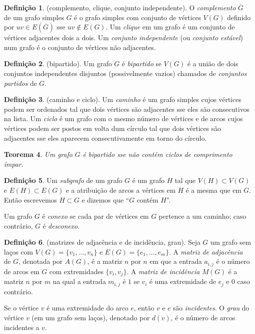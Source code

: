\documentclass{article}
\theoremstyle{plain}
\newtheorem{thm}{Teorema}[section]
\theoremstyle{definition}
\newtheorem{defn}[thm]{Definição}
\theoremstyle{remark}
\begin{document}
\begin{defn} (complemento, clique, conjunto independente).
    O \emph{complemento} \(\overline{G}\) de um grafo simples \(G\) é o grafo simples com conjunto de vértices \(V(G)\) definido por \(uv \in E(\overline{G})\) sse \(uv \notin E(G)\).
    Um \emph{clique} em um grafo é um conjunto de vértices adjacentes dois a dois. Um \emph{conjunto independente} (ou \emph{conjunto estável}) num grafo é o conjunto de vértices não adjacentes.
\end{defn}

\begin{defn} (bipartido).
    Um grafo \(G\) é \emph{bipartido} se \(V(G)\) é a união de dois conjuntos independentes disjuntos (possivelmente vazios) chamados de \emph{conjuntos partidos} de \(G\).
\end{defn}

\begin{defn} (caminho e ciclo).
    Um \emph{caminho} é um grafo simples cujos vértices podem ser ordenados tal que dois vértices são adjacentes sse eles são consecutivos na lista.
    Um \emph{ciclo} é um grafo com o mesmo número de vértices e de arcos cujos vértices podem ser postos em volta dum círculo tal que dois vértices são adjacentes sse eles aparecem consecutivamente em torno do círculo.
\end{defn}

\begin{thm}
    Um grafo \(G\) é bipartido sse não contém ciclos de comprimento ímpar.
\end{thm}

\begin{defn}
    Um \emph{subgrafo} de um grafo \(G\) é um grafo \(H\) tal que \(V(H) \subset V(G)\) e \(E(H) \subset E(G)\) e a atribuição de arcos a vértices em \(H\) é a mesma que em \(G\).
    Então escrevemos \(H \subset G\) e dizemos que ``\(G\) contém \(H\)''.
    
    Um grafo \(G\) é \emph{conexo} se cada par de vértices em \(G\) pertence a um caminho; caso contrário, \(G\) é \emph{desconexo}.
\end{defn}

\begin{defn} (matrizes de adjacência e de incidência, grau).
    Seja \(G\) um grafo sem laços com \(V(G) = \{v_1, \ldots, v_n\}\) e \(E(G) = \{e_1, \ldots, e_m\}\). A \emph{matriz de adjacência} de \(G\), denotada por \(A(G)\), é a matriz \(n\) por \(n\) em que a entrada \(a_{i,j}\)
    é o número de arcos em \(G\) com extremidades \(\{v_i, v_j\}\). A \emph{matriz de incidência} \(M(G)\) é a matriz \(n\) por \(m\) na qual a entrada \(m_{i,j}\) é \(1\) se \(v_i\) é uma extremidade de \(e_j\) e 0 caso contrário.

    Se o vértice \(v\) é uma extremidade do arco \(e\), então \(v\) e \(e\) são \emph{incidentes}. O \emph{grau} do vértice \(v\) (em um grafo sem laços), denotado por \(d(v)\), é o número de arcos incidentes a \(v\).
\end{defn}
\end{document}

